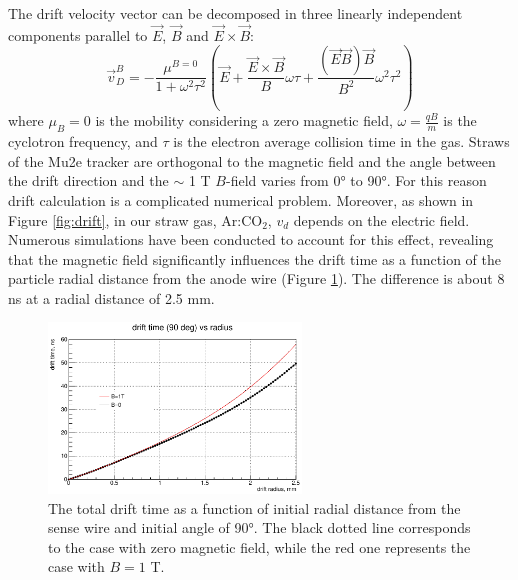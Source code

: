 The drift velocity vector can be decomposed in three linearly independent components parallel to $\vec{E}$, 
$\vec{B}$ and $\vec{E} \times \vec{B}$: 
\begin{equation}
    \vec{v}_D^B=-\frac{\mu^{B=0}}{1+\omega^2 \tau^2}\left(\vec{E}+\frac{\vec{E} \times \vec{B}}{B} \omega \tau+\frac{(\vec{E} \vec{B}) \vec{B}}{B^2} \omega^2 \tau^2\right)
\end{equation}
where $\mu_B = 0$ is the mobility considering a zero magnetic field, 
$\omega = \frac{qB}{m}$ is the cyclotron frequency, and $\tau$ is the electron average collision time in the gas.
Straws of the Mu2e tracker are orthogonal to the magnetic field and the 
angle between the drift direction and the $\sim$ 1 T $B$-field varies from 0° to 90°. For this 
reason drift calculation is a complicated numerical problem. Moreover, as shown in Figure \ref{fig:drift}, in 
our straw gas, Ar:CO$_2$, $v_{d}$ depends on the electric field. Numerous simulations 
have been conducted to account for this effect, revealing that the magnetic field 
significantly influences the drift time as a function of the particle radial distance from the anode wire (Figure \ref{fig:driftchange}). 
The difference is about 8 ns at a radial distance of 2.5 mm.
\begin{figure}[!h]
    \centering
    \includegraphics[width =0.6\textwidth]{figures/png/Screenshot_20240925_214957.png}
    \caption[The total drift time versus the initial radial distance from the
    sense wire.]{The total drift time as a function of initial radial distance from the
    sense wire and initial angle of 90°. The black dotted line corresponds 
    to the case with zero magnetic field, while the red one represents the case with $B=1$ T.}
    \label{fig:driftchange}
    \end{figure}
